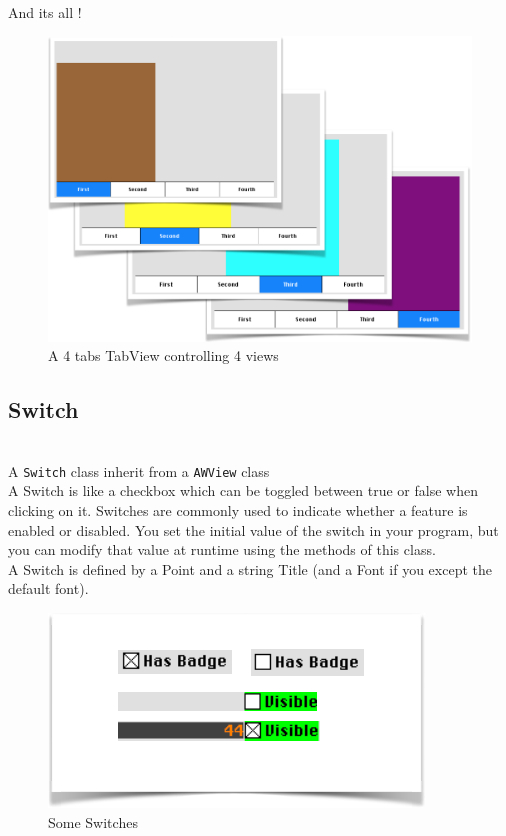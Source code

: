 \documentclass[a4paper,11pt]{extarticle}
\begin{document}
~\\ And its all !

\begin{figure}[htbp]
   \centering
   \includegraphics[scale=0.4]{AWFig141.png} 
   \caption{A 4 tabs TabView controlling 4 views}
   \label{fig:14 }
\end{figure}


\newpage
\subsection{Switch}

~\\ A \texttt{Switch} class inherit from a \texttt{AWView} class
~\\ A Switch is like a checkbox which can be toggled between true or false when clicking on it. Switches are commonly used to indicate whether a feature is enabled or disabled. You set the initial value of the switch in your program, but you can modify that value at runtime using the methods of this class.
~\\ A Switch is defined by a Point and a string Title (and a Font if you except the default font).
~\\

\begin{figure}[htbp]
   \centering
   \includegraphics[scale=0.55]{AWFig15.png} 
   \caption{Some Switches}
   \label{fig:15 }
\end{figure}
\end{document}

